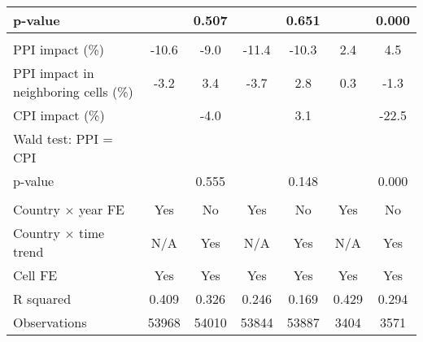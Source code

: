 {\begin{tabular}{l*{6}{c}}
\hspace{15pt} p-value&                     &       0.507         &                     &       0.651         &                     &       0.000         \\
\hline \\ PPI impact (\%)&       -10.6         &        -9.0         &       -11.4         &       -10.3         &         2.4         &         4.5         \\
PPI impact in neighboring cells (\%)&        -3.2         &         3.4         &        -3.7         &         2.8         &         0.3         &        -1.3         \\
CPI impact (\%)     &                     &        -4.0         &                     &         3.1         &                     &       -22.5         \\
Wald test: PPI = CPI&                     &                     &                     &                     &                     &                     \\
\hspace{15pt} p-value&                     &       0.555         &                     &       0.148         &                     &       0.000         \\
\hline \\ Country $\times$ year FE&         Yes         &          No         &         Yes         &          No         &         Yes         &          No         \\
Country $\times$ time trend&         N/A         &         Yes         &         N/A         &         Yes         &         N/A         &         Yes         \\
Cell FE             &         Yes         &         Yes         &         Yes         &         Yes         &         Yes         &         Yes         \\
R squared           &       0.409         &       0.326         &       0.246         &       0.169         &       0.429         &       0.294         \\
Observations        &       53968         &       54010         &       53844         &       53887         &        3404         &        3571         \\
\hline\hline
\end{tabular}
}
